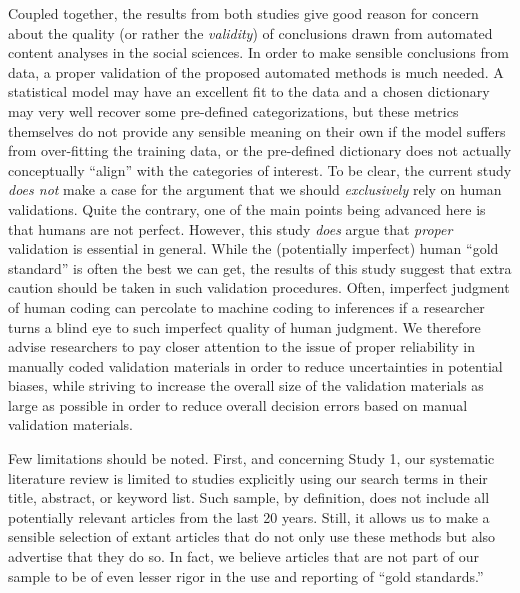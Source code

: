 \documentclass[man, floatsintext, 12pt, a4paper, noextraspace]{apa6}
\begin{document}
    Coupled together, the results from both studies give good reason for concern about the quality (or rather the \textit{validity}) of conclusions drawn from automated content analyses in the social sciences. In order to make sensible conclusions from data, a proper validation of the proposed automated methods is much needed. A statistical model may have an excellent fit to the data and a chosen dictionary may very well recover some pre-defined categorizations, but these metrics themselves do not provide any sensible meaning on their own if the model suffers from over-fitting the training data, or the pre-defined dictionary does not actually conceptually \enquote{align} with the categories of interest. To be clear, the current study \textit{does not} make a case for the argument that we should \textit{exclusively} rely on human validations. Quite the contrary, one of the main points being advanced here is that humans are not perfect. However, this study \textit{does} argue that \textit{proper} validation is essential in general. While the (potentially imperfect) human \enquote{gold standard} is often the best we can get, the results of this study suggest that extra caution should be taken in such validation procedures. Often, imperfect judgment of human coding can percolate to machine coding to inferences if a researcher turns a blind eye to such imperfect quality of human judgment. We therefore advise researchers to pay closer attention to the issue of proper reliability in manually coded validation materials in order to reduce uncertainties in potential biases, while striving to increase the overall size of the validation materials as large as possible in order to reduce overall decision errors based on manual validation materials.    

    Few limitations should be noted. First, and concerning Study 1, our systematic literature review is limited to studies explicitly using our search terms in their title, abstract, or keyword list. Such sample, by definition, does not include all potentially relevant articles from the last 20 years. Still, it allows us to make a sensible selection of extant articles that do not only use these methods but also advertise that they do so. In fact, we believe articles that are not part of our sample to be of even lesser rigor in the use and reporting of \enquote{gold standards.}
    
\end{document}
